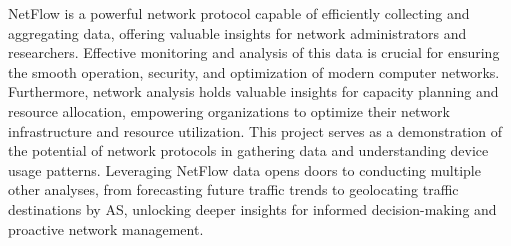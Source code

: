 \documentclass{article}
\begin{document}
NetFlow is a powerful network protocol capable of efficiently collecting and aggregating data, offering valuable insights for network administrators and researchers. Effective monitoring and analysis of this data is crucial for ensuring the smooth operation, security, and optimization of modern computer networks. Furthermore, network analysis holds valuable insights for capacity planning and resource allocation, empowering organizations to optimize their network infrastructure and resource utilization. This project serves as a demonstration of the potential of network protocols in gathering data and understanding device usage patterns. Leveraging NetFlow data opens doors to conducting multiple other analyses, from forecasting future traffic trends to geolocating traffic destinations by AS, unlocking deeper insights for informed decision-making and proactive network management.
\end{document}
